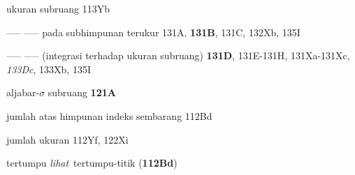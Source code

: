 




















ukuran subruang 113Yb  

----- -----  pada subhimpunan terukur 131A, {\bf 131B}, 131C, 132Xb,
135I  

----- -----  (integrasi terhadap ukuran subruang) {\bf 131D},
131E-131H, 
131Xa-131Xc, 
{\it 133Dc}, 133Xb, 135I







aljabar-$\sigma$ subruang {\bf 121A}












jumlah atas himpunan indeks sembarang 112Bd

jumlah ukuran 112Yf, 122Xi


























{tertumpu {\it lihat}}\
tertumpu-titik ({\bf 112Bd})
































